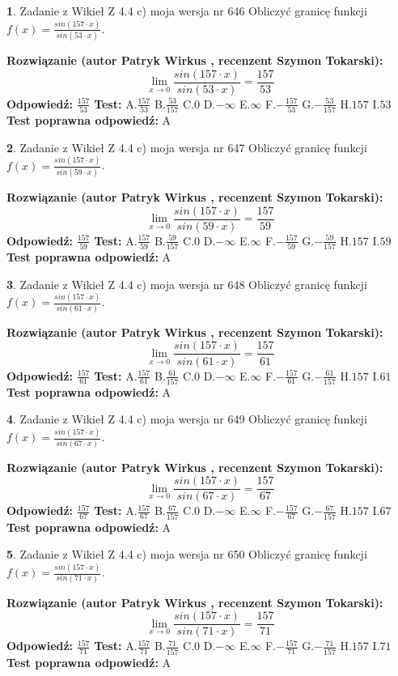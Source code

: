\documentclass[12pt, a4paper]{article}
\theoremstyle{definition} %
\newtheorem{zad}{}
\newcommand{\zadStart}[1]{\begin{zad}#1\newline}
\newcommand{\zadStop}{\end{zad}}
\newcommand{\rozwStart}[2]{\noindent \textbf{Rozwiązanie (autor #1 , recenzent #2): }\newline}
\newcommand{\rozwStop}{\newline}
\newcommand{\odpStart}{\noindent \textbf{Odpowiedź:}\newline}
\newcommand{\odpStop}{\newline}
\newcommand{\testStart}{\noindent \textbf{Test:}\newline}
\newcommand{\testStop}{\newline}
\newcommand{\kluczStart}{\noindent \textbf{Test poprawna odpowiedź:}\newline}
\newcommand{\kluczStop}{\newline}
\begin{document}
\zadStart{Zadanie z Wikieł Z 4.4 c) moja wersja nr 646}
Obliczyć granicę funkcji $f(x)=\frac{sin(157\cdot x)}{sin(53\cdot x)}$.
\zadStop
\rozwStart{Patryk Wirkus}{Szymon Tokarski}
$$\lim\limits_{x\to 0}\frac{sin(157\cdot x)}{sin(53\cdot x)}=
\frac{157}{53}$$
\rozwStop
\odpStart
$\frac{157}{53}$
\odpStop
\testStart
A.$\frac{157}{53}$
B.$\frac{53}{157}$
C.$0$
D.$-\infty$
E.$\infty$
F.$-\frac{157}{53}$
G.$-\frac{53}{157}$
H.$157$
I.$53$
\testStop
\kluczStart
A
\kluczStop



\zadStart{Zadanie z Wikieł Z 4.4 c) moja wersja nr 647}
Obliczyć granicę funkcji $f(x)=\frac{sin(157\cdot x)}{sin(59\cdot x)}$.
\zadStop
\rozwStart{Patryk Wirkus}{Szymon Tokarski}
$$\lim\limits_{x\to 0}\frac{sin(157\cdot x)}{sin(59\cdot x)}=
\frac{157}{59}$$
\rozwStop
\odpStart
$\frac{157}{59}$
\odpStop
\testStart
A.$\frac{157}{59}$
B.$\frac{59}{157}$
C.$0$
D.$-\infty$
E.$\infty$
F.$-\frac{157}{59}$
G.$-\frac{59}{157}$
H.$157$
I.$59$
\testStop
\kluczStart
A
\kluczStop



\zadStart{Zadanie z Wikieł Z 4.4 c) moja wersja nr 648}
Obliczyć granicę funkcji $f(x)=\frac{sin(157\cdot x)}{sin(61\cdot x)}$.
\zadStop
\rozwStart{Patryk Wirkus}{Szymon Tokarski}
$$\lim\limits_{x\to 0}\frac{sin(157\cdot x)}{sin(61\cdot x)}=
\frac{157}{61}$$
\rozwStop
\odpStart
$\frac{157}{61}$
\odpStop
\testStart
A.$\frac{157}{61}$
B.$\frac{61}{157}$
C.$0$
D.$-\infty$
E.$\infty$
F.$-\frac{157}{61}$
G.$-\frac{61}{157}$
H.$157$
I.$61$
\testStop
\kluczStart
A
\kluczStop



\zadStart{Zadanie z Wikieł Z 4.4 c) moja wersja nr 649}
Obliczyć granicę funkcji $f(x)=\frac{sin(157\cdot x)}{sin(67\cdot x)}$.
\zadStop
\rozwStart{Patryk Wirkus}{Szymon Tokarski}
$$\lim\limits_{x\to 0}\frac{sin(157\cdot x)}{sin(67\cdot x)}=
\frac{157}{67}$$
\rozwStop
\odpStart
$\frac{157}{67}$
\odpStop
\testStart
A.$\frac{157}{67}$
B.$\frac{67}{157}$
C.$0$
D.$-\infty$
E.$\infty$
F.$-\frac{157}{67}$
G.$-\frac{67}{157}$
H.$157$
I.$67$
\testStop
\kluczStart
A
\kluczStop



\zadStart{Zadanie z Wikieł Z 4.4 c) moja wersja nr 650}
Obliczyć granicę funkcji $f(x)=\frac{sin(157\cdot x)}{sin(71\cdot x)}$.
\zadStop
\rozwStart{Patryk Wirkus}{Szymon Tokarski}
$$\lim\limits_{x\to 0}\frac{sin(157\cdot x)}{sin(71\cdot x)}=
\frac{157}{71}$$
\rozwStop
\odpStart
$\frac{157}{71}$
\odpStop
\testStart
A.$\frac{157}{71}$
B.$\frac{71}{157}$
C.$0$
D.$-\infty$
E.$\infty$
F.$-\frac{157}{71}$
G.$-\frac{71}{157}$
H.$157$
I.$71$
\testStop
\kluczStart
A
\kluczStop
\end{document}
